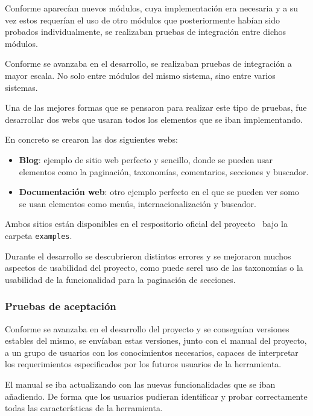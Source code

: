 \documentclass[a4paper,12pt]{article}
\begin{document}
Conforme aparecían nuevos módulos, cuya implementación era necesaria y a su vez estos requerían el uso de otro módulos que
posteriormente habían sido probados individualmente, se realizaban pruebas de integración entre dichos módulos.

Conforme se avanzaba en el desarrollo, se realizaban pruebas de integración a mayor escala. No solo entre módulos
del mismo sistema, sino entre varios sistemas.

Una de las mejores formas que se pensaron para realizar este tipo de pruebas, fue desarrollar dos webs que usaran todos 
los elementos que se iban implementando.

En concreto se crearon las dos siguientes webs:

\begin{itemize}
    \item \textbf{Blog}: ejemplo de sitio web perfecto y sencillo, donde se pueden usar elementos como la paginación,
        taxonomías, comentarios, secciones y buscador.
    \item \textbf{Documentación web}: otro ejemplo perfecto en el que se pueden ver somo se usan elementos como menús,
        internacionalización y buscador.
\end{itemize}

Ambos sitios están disponibles en el respositorio oficial del proyecto~\cite{repositorio}
bajo la carpeta \texttt{examples}.

Durante el desarrollo se descubrieron distintos errores y se mejoraron muchos aspectos de usabilidad del proyecto, 
como puede serel uso de las taxonomías o la usabilidad de la funcionalidad para la paginación de secciones.


\subsubsection{Pruebas de aceptación}

Conforme se avanzaba en el desarrollo del proyecto y se conseguían versiones estables del mismo, se
envíaban estas versiones, junto con el manual del proyecto, a un grupo de usuarios con los conocimientos
necesarios, capaces de interpretar los requerimientos especificados por los futuros usuarios de la herramienta.

El manual se iba actualizando con las nuevas funcionalidades que se iban añadiendo. De forma que
los usuarios pudieran identificar y probar correctamente todas las características de la herramienta.
\end{document}
